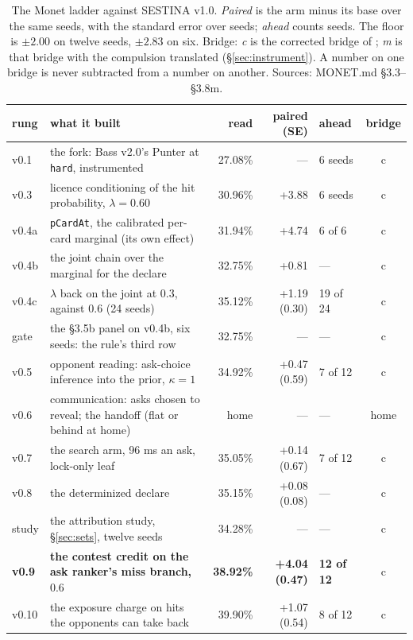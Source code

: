 \documentclass[11pt]{article}
\newcommand{\code}[1]{\texttt{#1}}
\newcommand{\monet}{MONET.md}
\begin{document}
\begin{table}[t]
\centering\footnotesize
\setlength{\tabcolsep}{4pt}
\caption{The Monet ladder against SESTINA v1.0. \emph{Paired} is the arm minus its base over the
same seeds, with the standard error over seeds; \emph{ahead} counts seeds. The floor is $\pm 2.00$
on twelve seeds, $\pm 2.83$ on six. Bridge: \emph{c} is the corrected bridge of \cite{frontier};
\emph{m} is that bridge with the compulsion translated (\S\ref{sec:instrument}). A number on one
bridge is never subtracted from a number on another. Sources: \monet{} \S3.3--\S3.8m.}
\label{tab:ladder}
\begin{tabular}{@{}l p{} r r l c@{}}
\toprule
rung & what it built & read & paired (SE) & ahead & bridge \\
\midrule
v0.1 & the fork: Bass v2.0's Punter at \code{hard}, instrumented & 27.08\% & --- & 6 seeds & c \\
v0.3 & licence conditioning of the hit probability, $\lambda=0.60$ & 30.96\% & +3.88 & 6 seeds & c \\
v0.4a & \code{pCardAt}, the calibrated per-card marginal (its own effect) & 31.94\% & +4.74 & 6 of 6 & c \\
v0.4b & the joint chain over the marginal for the declare & 32.75\% & +0.81 & --- & c \\
v0.4c & $\lambda$ back on the joint at $0.3$, against $0.6$ (24 seeds) & 35.12\% & +1.19 (0.30) & 19 of 24 & c \\
gate & the \S3.5b panel on v0.4b, six seeds: the rule's third row & 32.75\% & --- & --- & c \\
v0.5 & opponent reading: ask-choice inference into the prior, $\kappa=1$ & 34.92\% & +0.47 (0.59) & 7 of 12 & c \\
v0.6 & communication: asks chosen to reveal; the handoff (flat or behind at home) & home & --- & --- & home \\
v0.7 & the search arm, 96 ms an ask, lock-only leaf & 35.05\% & +0.14 (0.67) & 7 of 12 & c \\
v0.8 & the determinized declare & 35.15\% & +0.08 (0.08) & --- & c \\
study & the attribution study, \S\ref{sec:sets}, twelve seeds & 34.28\% & --- & --- & c \\
\textbf{v0.9} & \textbf{the contest credit on the ask ranker's miss branch, $0.6$} & \textbf{38.92\%} & \textbf{+4.04 (0.47)} & \textbf{12 of 12} & c \\
v0.10 & the exposure charge on hits the opponents can take back & 39.90\% & +1.07 (0.54) & 8 of 12 & c \\

\end{tabular}
\end{table}
\end{document}
